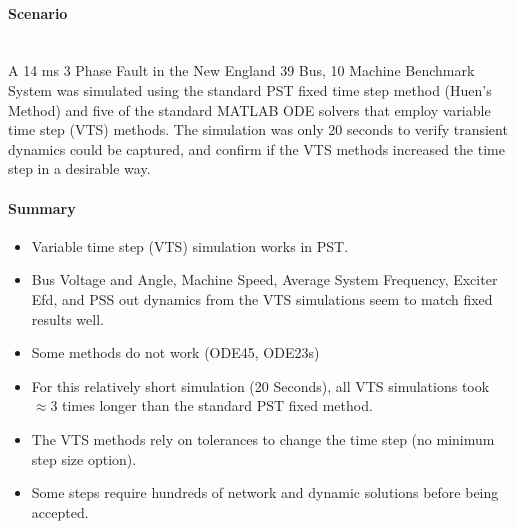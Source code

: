\documentclass[12pt]{article}
\begin{document}
\onehalfspacing
\paragraph{Scenario} \ \\
A 14 ms 3 Phase Fault in the New England 39 Bus, 10 Machine Benchmark System was simulated using the standard PST fixed time step method (Huen's Method) and five of the standard MATLAB ODE solvers that employ variable time step (VTS) methods.
The simulation was only 20 seconds to verify transient dynamics could be captured, and confirm if the VTS methods increased the time step in a desirable way.

\paragraph{Summary} 
\begin{itemize}
\item Variable time step (VTS) simulation works in PST.
\item Bus Voltage and Angle, Machine Speed, Average System Frequency, Exciter Efd, and PSS out dynamics from the VTS simulations seem to match fixed results well.
\item Some methods do not work (ODE45, ODE23s)
\item For this relatively short simulation (20 Seconds), all VTS simulations took $\approx$3 times longer than the standard PST fixed method.
\item The VTS methods rely on tolerances to change the time step (no minimum step size option).
\item Some steps require hundreds of network and dynamic solutions before being accepted.
\end{itemize}
\end{document}
